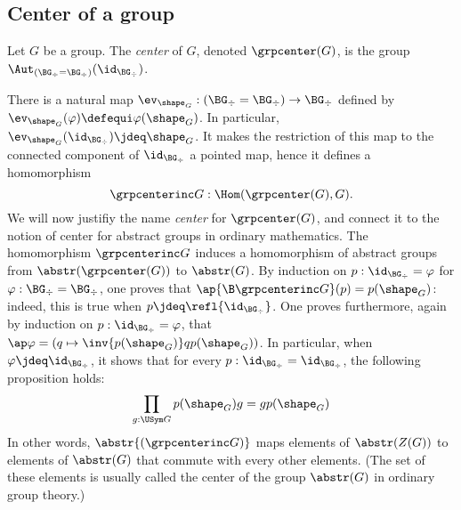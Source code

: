 \subsection{Center of a group}
\label{sec:center-group}

\begin{definition}
  Let $G$ be a group. The {\em center} of $G$, denoted
  $\grpcenter(G)$, is the group
  $\Aut_{(\BG_\div=\BG_\div)}(\id_{\BG_\div})$.%
\end{definition}

There is a natural map
$\ev_{\shape_G} : (\BG_\div=\BG_\div) \to \BG_\div$ defined by
$\ev_{\shape_G}(\varphi)\defequi \varphi(\shape_G)$. In particular,
$\ev_{\shape_G}(\id_{\BG_\div}) \jdeq \shape_G$. It makes the restriction
of this map to the connected component of $\id_{\BG_\div}$ a
pointed map, hence it defines a homomorphism
\begin{displaymath}
  \grpcenterinc G : \Hom(\grpcenter(G), G).
\end{displaymath}
We will now justifiy the name {\em center} for $\grpcenter(G)$, and
connect it to the notion of center for abstract groups in ordinary
mathematics. The homomorphism $\grpcenterinc G$ induces a homomorphism
of abstract groups from $\abstr(\grpcenter(G))$ to $\abstr(G)$. By
induction on $p:\id_{\BG_\div} = \varphi$ for
$\varphi:\BG_\div=\BG_\div$, one proves that
$\ap{\B \grpcenterinc G}(p) = p(\shape_G)$: indeed, this is true when
$p\jdeq \refl {\id_{\BG_\div}}$. One proves furthermore, again by
induction on $p:\id_{\BG_\div} = \varphi$, that
$\ap \varphi = (q\mapsto \inv{p(\shape_G)} q p(\shape_G))$. In particular,
when $\varphi \jdeq \id_{\BG_\div}$, it shows that for every
$p:\id_{\BG_\div}=\id_{\BG_\div}$, the following proposition
holds:
\begin{displaymath}
  \prod_{g:\USym G }p(\shape_G) g = g p(\shape_G)
\end{displaymath}
In other words, $\abstr{(\grpcenterinc G)}$ maps elements of
$\abstr(Z(G))$ to elements of $\abstr(G)$ that commute with every
other elements. (The set of these elements is usually called the
center of the group $\abstr(G)$ in ordinary group theory.)

